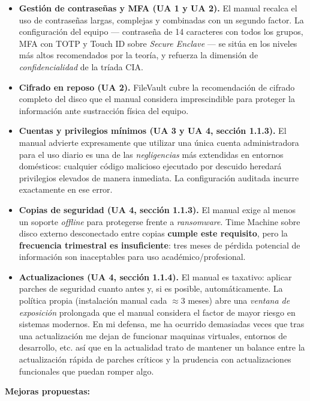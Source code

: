 \begin{itemize}[leftmargin=*]
    \item \textbf{Gestión de contraseñas y MFA (UA 1 y UA 2).} El manual recalca el uso de contraseñas largas, complejas y combinadas con un segundo factor. La configuración del equipo --- contraseña de 14 caracteres con todos los grupos, MFA con TOTP y Touch ID sobre \textit{Secure Enclave} --- se sitúa en los niveles más altos recomendados por la teoría, y refuerza la dimensión de \textit{confidencialidad} de la tríada CIA.
    \item \textbf{Cifrado en reposo (UA 2).} FileVault cubre la recomendación de cifrado completo del disco que el manual considera imprescindible para proteger la información ante sustracción física del equipo.
    \item \textbf{Cuentas y privilegios mínimos (UA 3 y UA 4, sección 1.1.3).} El manual advierte expresamente que utilizar una única cuenta administradora para el uso diario es una de las \emph{negligencias} más extendidas en entornos domésticos: cualquier código malicioso ejecutado por descuido heredará privilegios elevados de manera inmediata. La configuración auditada incurre exactamente en ese error.
    \item \textbf{Copias de seguridad (UA 4, sección 1.1.3).} El manual exige al menos un soporte \textit{offline} para protegerse frente a \textit{ransomware}. Time Machine sobre disco externo desconectado entre copias \textbf{cumple este requisito}, pero la \textbf{frecuencia trimestral es insuficiente}: tres meses de pérdida potencial de información son inaceptables para uso académico/profesional.
    \item \textbf{Actualizaciones (UA 4, sección 1.1.4).} El manual es taxativo: aplicar parches de seguridad cuanto antes y, si es posible, automáticamente. La política propia (instalación manual cada $\approx$3 meses) abre una \textit{ventana de exposición} prolongada que el manual considera el factor de mayor riesgo en sistemas modernos. En mi defensa, me ha ocurrido demasiadas veces que tras una actualización me dejan de funcionar maquinas virtuales, entornos de desarrollo, etc. así que en la actualidad trato de mantener un balance entre la actualización rápida de parches críticos y la prudencia con actualizaciones funcionales que puedan romper algo.
\end{itemize}

\textbf{Mejoras propuestas:}


